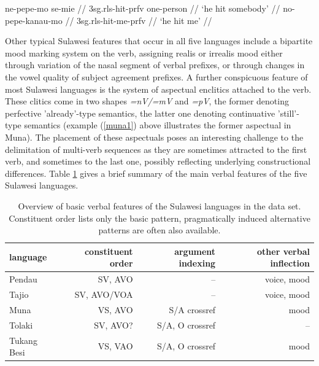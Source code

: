\pex \label{muna1}
\a
\begingl
\gla ne-pepe-mo se-mie // 
\glb \acs{3}\acs{sg}.\acs{rls}-hit-\acs{prfv} one-person //
\glft `he hit somebody' // 
\endgl
\a
\begingl
\gla no-pepe-kanau-mo // 
\glb \acs{3}\acs{sg}.\acs{rls}-hit-me-\acs{prfv} //
\glft `he hit me' // 
\endgl
\xe

Other typical Sulawesi features that occur in all five languages include a bipartite mood marking system on the verb, assigning realis or irrealis mood either through variation of the nasal segment of verbal prefixes, or through changes in the vowel quality of subject agreement prefixes. A further conspicuous feature of most Sulawesi languages is the system of aspectual enclitics attached to the verb. These clitics come in two shapes \textit{=nV/=mV} and \textit{=pV}, the former denoting perfective 'already'-type semantics, the latter one denoting continuative 'still'-type semantics (example (\ref{muna1}) above illustrates the former aspectual in Muna). The placement of these aspectuals poses an interesting challenge to the delimitation of multi-verb sequences as they are sometimes attracted to the first verb, and sometimes to the last one, possibly reflecting underlying constructional differences. Table \ref{table:overviewsulawesi} gives a brief summary of the main verbal features of the five Sulawesi languages.

\begin{table}
\begin{center}
\begin{footnotesize}
\begin{tabular}{l r r r}
\hline\hline
language & constituent order & argument indexing & other verbal inflection \tabularnewline
\hline
Pendau & SV, AVO & -- & voice, mood \tabularnewline
Tajio & SV, AVO/VOA & -- & voice, mood \tabularnewline
\hline
Muna & VS, AVO & S/A crossref & mood \tabularnewline
Tolaki & SV, AVO? & S/A, O crossref & -- \tabularnewline
Tukang Besi & VS, VAO & S/A, O crossref & mood \tabularnewline
\hline
\end{tabular}
\caption[Basic verbal features of the Sulawesi languages]{Overview of basic verbal features of the Sulawesi languages in the data set. Constituent order lists only the basic pattern, pragmatically induced alternative patterns are often also available.}
\label{table:overviewsulawesi}
\end{footnotesize}
\end{center}
\end{table}
\FloatBarrier

